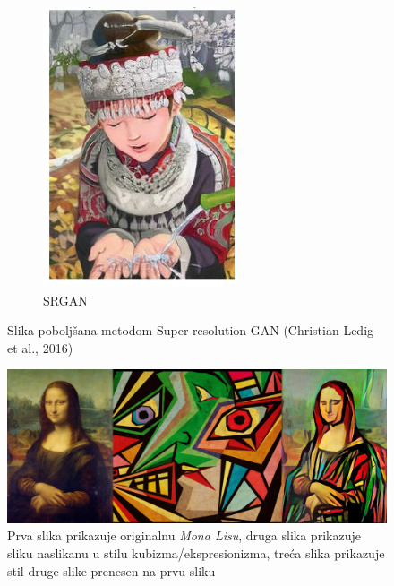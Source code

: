 \begin{enumerate}
\begin{figure}[htp]
\begin{subfigure}[b]{0.4\linewidth}
		\includegraphics[width=\linewidth]{img/SRGAN.png}
		\caption{SRGAN}
	\end{subfigure}
	\caption{Slika poboljšana metodom Super-resolution GAN (Christian Ledig et al., 2016)}
	\label{img:SRGAN}
\end{figure}

\begin{figure}[htp]
	\centering
	\includegraphics[width=\linewidth]{img/StyleTransfer.png}
	\caption{Prva slika prikazuje originalnu \textit{Mona Lisu}, druga slika prikazuje sliku naslikanu u stilu kubizma/ekspresionizma, treća slika prikazuje stil druge slike prenesen na prvu sliku}
	\label{img:styleTransfer}
\end{figure}


\end{enumerate}
